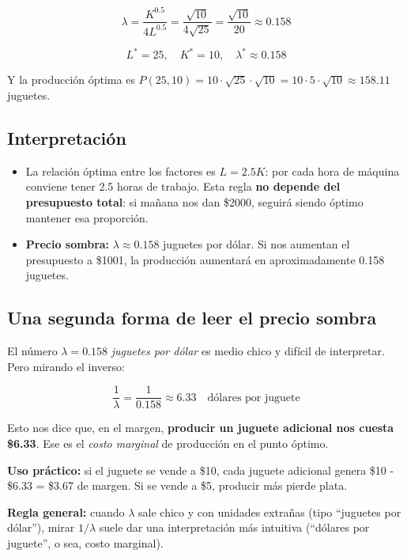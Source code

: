 \documentclass[12pt]{article}
\begin{document}
\[
\lambda = \frac{K^{0.5}}{4 L^{0.5}} = \frac{\sqrt{10}}{4 \sqrt{25}} = \frac{\sqrt{10}}{20} \approx 0.158
\]

\[
\boxed{L^* = 25, \quad K^* = 10, \quad \lambda^* \approx 0.158}
\]

Y la producción óptima es $P(25, 10) = 10 \cdot \sqrt{25} \cdot \sqrt{10} = 10 \cdot 5 \cdot \sqrt{10} \approx 158.11$ juguetes.

\subsection{Interpretación}

\begin{itemize}
    \item La relación óptima entre los factores es $L = 2.5 K$: por cada hora de máquina conviene tener 2.5 horas de trabajo. Esta regla \textbf{no depende del presupuesto total}: si mañana nos dan \$2000, seguirá siendo óptimo mantener esa proporción.
    \item \textbf{Precio sombra:} $\lambda \approx 0.158$ juguetes por dólar. Si nos aumentan el presupuesto a \$1001, la producción aumentará en aproximadamente 0.158 juguetes.
\end{itemize}

\subsection{Una segunda forma de leer el precio sombra}

El número $\lambda = 0.158$ \textit{juguetes por dólar} es medio chico y difícil de interpretar. Pero mirando el inverso:

\[
\frac{1}{\lambda} = \frac{1}{0.158} \approx 6.33 \quad \text{dólares por juguete}
\]

\vspace{0.3em}

Esto nos dice que, en el margen, \textbf{producir un juguete adicional nos cuesta \$6.33}. Ese es el \textit{costo marginal} de producción en el punto óptimo.

\vspace{0.5em}

\textbf{Uso práctico:} si el juguete se vende a \$10, cada juguete adicional genera \$10 - \$6.33 = \$3.67 de margen. Si se vende a \$5, producir más pierde plata.

\vspace{0.5em}

\textbf{Regla general:} cuando $\lambda$ sale chico y con unidades extrañas (tipo ``juguetes por dólar''), mirar $1/\lambda$ suele dar una interpretación más intuitiva (``dólares por juguete'', o sea, costo marginal).
\end{document}
